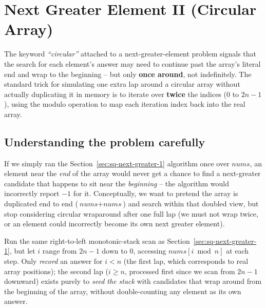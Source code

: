 \section{Next Greater Element II (Circular Array)}
\label{sec:sq-next-greater-2}


\begin{patternbox}
The keyword \emph{``circular''} attached to a next-greater-element problem
signals that the search for each element's answer may need to continue
past the array's literal end and wrap to the beginning -- but only
\textbf{once around}, not indefinitely. The standard trick for simulating
one extra lap around a circular array without actually duplicating it in
memory is to iterate over \textbf{twice} the indices ($0$ to $2n-1$), using
the modulo operation to map each iteration index back into the real array.
\end{patternbox}

\subsection*{Understanding the problem carefully}

If we simply ran the Section~\ref{sec:sq-next-greater-1} algorithm once
over $\textit{nums}$, an element near the \emph{end} of the array would
never get a chance to find a next-greater candidate that happens to sit
near the \emph{beginning} -- the algorithm would incorrectly report $-1$
for it. Conceptually, we want to pretend the array is duplicated end to
end ($\textit{nums} + \textit{nums}$) and search within that doubled view,
but stop considering circular wraparound after one full lap (we must not
wrap twice, or an element could incorrectly become its own next greater
element).

\begin{ideabox}
Run the same right-to-left monotonic-stack scan as
Section~\ref{sec:sq-next-greater-1}, but let $i$ range from $2n-1$ down
to $0$, accessing $\textit{nums}[i \bmod n]$ at each step. Only
\emph{record} an answer for $i < n$ (the first lap, which corresponds to
real array positions); the second lap ($i \ge n$, processed first since we
scan from $2n-1$ downward) exists purely to \emph{seed the stack} with
candidates that wrap around from the beginning of the array, without
double-counting any element as its own answer.
\end{ideabox}

